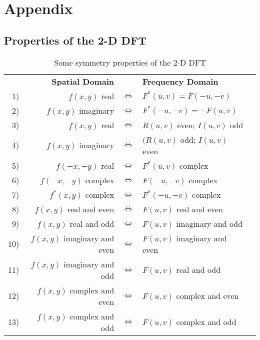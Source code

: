 \appendix
{}
\section{Appendix}
\subsection{Properties of the 2-D DFT}

\begin{table}[htbp]
	\centering
	\begin{tabular}{|rrllp{0.1cm}|}
	\hline
	& \textbf{Spatial Domain} & & \textbf{Frequency Domain} & \\
	1) & $f(x,y)$ real & $\Leftrightarrow$ & $F^*(u,v) = F(-u,-v)$ & \\
	2) & $f(x,y)$ imaginary & $\Leftrightarrow$ & $F^*(-u,-v) = -F(u,v)$ & \\
	3) & $f(x,y)$ real & $\Leftrightarrow$ & $R(u,v)$ even; $I(u,v)$ odd & \\
	4) & $f(x,y)$ imaginary & $\Leftrightarrow$ & $(R(u,v)$ odd; $I(u,v)$ even & \\
	5) & $f(-x,-y)$ real & $\Leftrightarrow$ & $F^*(u,v)$ complex & \\
	6) & $f(-x,-y)$ complex & $\Leftrightarrow$ & $F(-u,-v)$ complex & \\
	7) & $f^*(x,y)$ complex & $\Leftrightarrow$ & $F^*(-u,-v)$ complex & \\
	8) & $f(x,y)$ real and even & $\Leftrightarrow$ & $F(u,v)$ real and even & \\
	9) & $f(x,y)$ real and odd & $\Leftrightarrow$ & $F(u,v)$ imaginary and odd & \\
	10) & $f(x,y)$ imaginary and even & $\Leftrightarrow$ & $F(u,v)$ imaginary and even & \\
	11) & $f(x,y)$ imaginary and odd & $\Leftrightarrow$ & $F(u,v)$ real and odd & \\
	12) & $f(x,y)$ complex and even & $\Leftrightarrow$ & $F(u,v)$ complex and even & \\
	13) & $f(x,y)$ complex and odd & $\Leftrightarrow$ & $F(u,v)$ complex and odd & \\
	\hline
	\end{tabular}
	\caption{Some symmetry properties of the 2-D DFT}
	\label{tab:Symmetry_2D_DFT}
\end{table}

